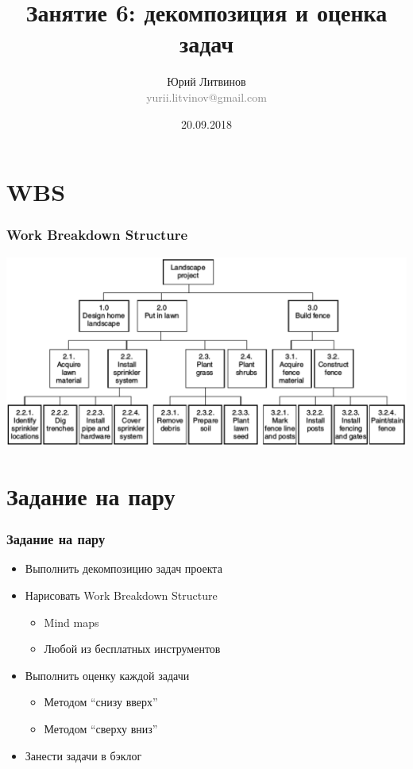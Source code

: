 \documentclass[xetex,mathserif,serif]{beamer}
\title{Занятие 6: декомпозиция и оценка задач}
\author[Юрий Литвинов]{Юрий Литвинов\\\small{\textcolor{gray}{yurii.litvinov@gmail.com}}}
\date{20.09.2018}
\begin{document}
	\frame{\titlepage}

	\section{WBS}

	\begin{frame}
		\frametitle{Work Breakdown Structure}
		\begin{center}
			\includegraphics[width=\textwidth]{wbs.png}
		\end{center}
	\end{frame}

	\section{Задание на пару}

	\begin{frame}
		\frametitle{Задание на пару}
		\begin{itemize}
			\item Выполнить декомпозицию задач проекта
			\item Нарисовать Work Breakdown Structure
			\begin{itemize}
				\item Mind maps
				\item Любой из бесплатных инструментов
			\end{itemize}
			\item Выполнить оценку каждой задачи
			\begin{itemize}
				\item Методом ``снизу вверх''
				\item Методом ``сверху вниз''
			\end{itemize}
			\item Занести задачи в бэклог
		\end{itemize}
	\end{frame}
\end{document}
